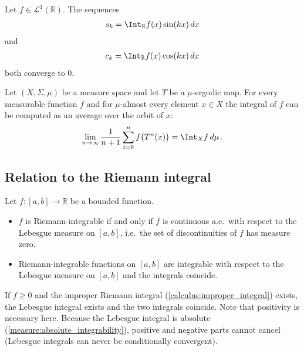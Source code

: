     \begin{theorem}\label{measure:riemann_lebesue_lemma}
        Let $f\in\mathcal{L}^1(\mathbb{R})$. The sequences
        \begin{gather}
            s_k=\Int_{\mathbb{R}}f(x)\sin(kx)\,dx
        \end{gather}
        and
        \begin{gather}
            c_k=\Int_{\mathbb{R}}f(x)\cos(kx)\,dx
        \end{gather}
        both converge to 0.
    \end{theorem}

    \begin{theorem}\label{measure:ergodic}
        Let $(X,\Sigma,\mu)$ be a measure space and let $T$ be a $\mu$-ergodic map. For every measurable function $f$ and for $\mu$-almost every element $x\in X$ the integral of $f$ can be computed as an average over the orbit of $x$:
        \begin{gather}
            \lim_{n\rightarrow\infty}\frac{1}{n+1}\sum_{t=0}^nf\bigl(T^n(x)\bigr) = \Int_Xf\,d\mu\,.
        \end{gather}
    \end{theorem}

\subsection{Relation to the Riemann integral}

    \begin{property}
        Let $f:[a,b]\rightarrow\mathbb{R}$ be a bounded function.
        \begin{itemize}
            \item $f$ is Riemann-integrable if and only if $f$ is continuous a.e.~with respect to the Lebesgue measure on $[a,b]$, i.e.~the set of discontinuities of $f$ has measure zero.
            \item Riemann-integrable functions on $[a,b]$ are integrable with respect to the Lebesgue measure on $[a,b]$ and the integrals coincide.
        \end{itemize}
    \end{property}

    \begin{property}
        If $f\geq0$ and the improper Riemann integral (\cref{calculus:improper_integral}) exists, the Lebesgue integral exists and the two integrals coincide. Note that positivity is necessary here. Because the Lebesgue integral is absolute (\cref{measure:absolute_integrability}), positive and negative parts cannot cancel (Lebesgue integrals can never be conditionally convergent).
    \end{property}

